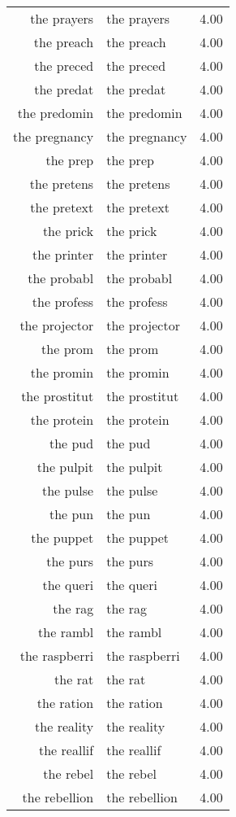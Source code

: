 \begin{table}[ht]
\begin{tabular}{rlr}
  the prayers & the prayers & 4.00 \\ 
  the preach & the preach & 4.00 \\ 
  the preced & the preced & 4.00 \\ 
  the predat & the predat & 4.00 \\ 
  the predomin & the predomin & 4.00 \\ 
  the pregnancy & the pregnancy & 4.00 \\ 
  the prep & the prep & 4.00 \\ 
  the pretens & the pretens & 4.00 \\ 
  the pretext & the pretext & 4.00 \\ 
  the prick & the prick & 4.00 \\ 
  the printer & the printer & 4.00 \\ 
  the probabl & the probabl & 4.00 \\ 
  the profess & the profess & 4.00 \\ 
  the projector & the projector & 4.00 \\ 
  the prom & the prom & 4.00 \\ 
  the promin & the promin & 4.00 \\ 
  the prostitut & the prostitut & 4.00 \\ 
  the protein & the protein & 4.00 \\ 
  the pud & the pud & 4.00 \\ 
  the pulpit & the pulpit & 4.00 \\ 
  the pulse & the pulse & 4.00 \\ 
  the pun & the pun & 4.00 \\ 
  the puppet & the puppet & 4.00 \\ 
  the purs & the purs & 4.00 \\ 
  the queri & the queri & 4.00 \\ 
  the rag & the rag & 4.00 \\ 
  the rambl & the rambl & 4.00 \\ 
  the raspberri & the raspberri & 4.00 \\ 
  the rat & the rat & 4.00 \\ 
  the ration & the ration & 4.00 \\ 
  the reality & the reality & 4.00 \\ 
  the reallif & the reallif & 4.00 \\ 
  the rebel & the rebel & 4.00 \\ 
  the rebellion & the rebellion & 4.00 \\ 

\end{tabular}
\end{table}
